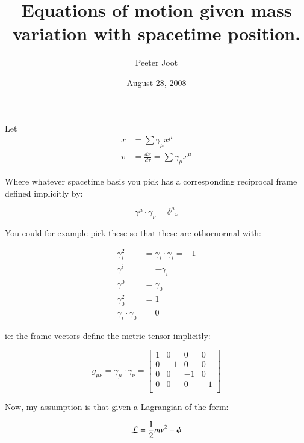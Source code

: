 \documentclass{article}      %
\title{ Equations of motion given mass variation with spacetime position. } %
\author{Peeter Joot}         %
\date{August 28, 2008}        %
\newcommand{\LL}[0]{\mathcal{L}}
\newcommand{\xdot}[0]{\dot{x}}
\begin{document}

\maketitle{}


Let
\begin{align*}
x &= \sum \gamma_{\mu} {x}^{\mu} \\
v &= \frac{dx}{d\tau} = \sum \gamma_{\mu} \xdot^{\mu}
\end{align*}

Where whatever spacetime basis you pick has a corresponding reciprocal frame defined implicitly by:

\begin{equation*}
\gamma^{\mu} \cdot \gamma_{\nu} = {\delta^{\mu}}_{\nu}
\end{equation*}

You could for example pick these so that these are othornormal with:

\begin{align*}
\gamma_{i}^2 &= \gamma_i \cdot \gamma_i = -1 \\
\gamma^{i} &= -\gamma_{i} \\
\gamma^{0} &= \gamma_{0} \\
\gamma_{0}^2 &= 1 \\
\gamma_{i} \cdot \gamma_0 &= 0
\end{align*}

ie: the frame vectors define the metric tensor implicitly:

\begin{equation*}
g_{\mu\nu} = \gamma_{\mu} \cdot \gamma_{\nu} =
\begin{bmatrix}
1 & 0 & 0 & 0 \\
0 & -1 & 0 & 0 \\
0 & 0 & -1 & 0 \\
0 & 0 & 0 & -1 \\
\end{bmatrix}
\end{equation*}

Now, my assumption is that given a Lagrangian of the form:

\begin{equation*}
\LL = \inv{2} m v^2 - \phi
\end{equation*}
\end{document}

